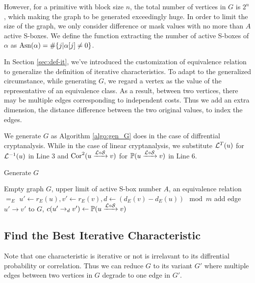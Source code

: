 However, for a primitive with block size $n$, the total number of vertices in $G$ is $2^n$, which making the graph to be generated exceedingly huge. In order to limit the size of the graph, we only consider difference or mask values with no more than $A$ active S-boxes. We define the function extracting the number of active S-boxes of $\alpha$ as $\text{Asn}(\alpha)=\#\{j|\alpha[j]\neq 0\}$. 

In Section \ref{sec:def-it}, we've introduced the customization of equivalence relation to generalize the definition of iterative characteristics. To adapt to the generalized circumstance, while generating $G$, we regard a vertex as the value of the representative of an equivalence class. As a result, between two vertices, there may be multiple edges corresponding to independent costs. Thus we add an extra dimension, the distance difference between the two original values, to index the edges. 

We generate $G$ as Algorithm \ref{algo:gen_G} does in the case of diffrential cryptanalysis. While in the case of linear cryptanalysis, we substitute $\mathcal{L}^{T}(u)$ for $\mathcal{L}^{-1}(u)$ in Line 3 and $\text{Cor}^2(u\xrightarrow{\mathcal{L}\circ\mathcal{S}}v)$ for $\mathbb{P}(u\xrightarrow{\mathcal{L}\circ\mathcal{S}}v)$ in Line 6. 

\begin{algorithm}
	\caption{Generate $G$}
	\label{algo:gen_G}
	\begin{algorithmic}[1]
		\Require Empty graph $G$, upper limit of active S-box number $A$, an equivalence relation $=_E$
		\Procedure {}{}
		\State $u'\leftarrow r_E(u),v'\leftarrow r_E(v),d\leftarrow (d_E(v)-d_E(u))\mod m$
		\State add edge $u'\rightarrow v'$ to $G$, $c(u'\rightarrow_d v')\leftarrow \mathbb{P}(u\xrightarrow{\mathcal{L}\circ\mathcal{S}}v)$
		\EndFor
		\EndIf
		\EndFor
		\EndProcedure
	\end{algorithmic}
\end{algorithm}

\subsection{Find the Best Iterative Characteristic}\label{sec:find_ite_c}

Note that one characteristic is iterative or not is irrelavant to its diffrential probability or correlation. Thus we can reduce $G$ to its variant $G'$ where multiple edges between two vertices in $G$ degrade to one edge in $G'$. 

